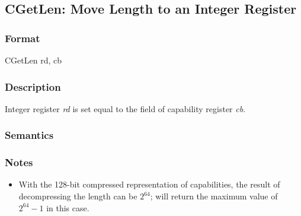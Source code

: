 \clearpage
{}
{}
\subsection*{CGetLen: Move Length to an Integer Register}

\subsubsection*{Format}

CGetLen rd, cb

\begin{center}
\end{center}

\subsubsection*{Description}

Integer register \textit{rd} is set equal to the \clength{} field of capability
register \textit{cb}.

\subsubsection*{Semantics}

\subsubsection*{Notes}

\begin{itemize}
\item
With the 128-bit compressed representation of capabilities, the result of
decompressing the length can be $2^{64}$;  will return
the maximum value of $2^{64}-1$ in this case.
\end{itemize}
